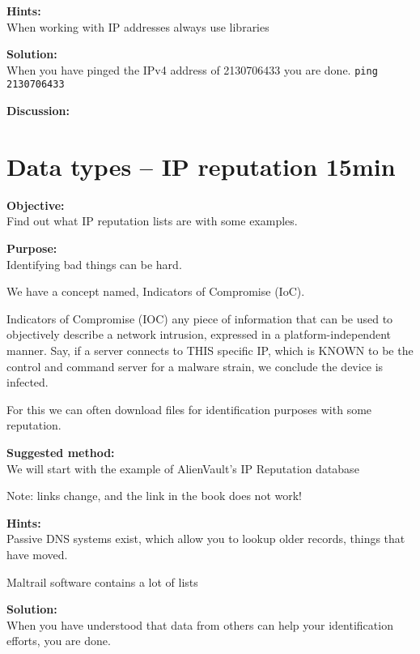 \documentclass[a4paper,11pt,notitlepage]{report}
\begin{document}
{\bf Hints:}\\
When working with IP addresses always use libraries

{\bf Solution:}\\
When you have pinged the IPv4 address of 2130706433 you are done.
\verb+ping 2130706433+


{\bf Discussion:}\\



\chapter{Data types -- IP reputation 15min}
\label{siem:ip-reputation}

{\bf Objective:}\\
Find out what IP reputation lists are with some examples.


{\bf Purpose:}\\
Identifying bad things can be hard.

We have a concept named, Indicators of Compromise (IoC).

Indicators of Compromise (IOC) any piece of information that can be used to objectively describe a network intrusion, expressed in a platform-independent manner. Say, if a server connects to THIS specific IP, which is KNOWN to be the control and command server for a malware strain, we conclude the device is infected.

For this we can often download files for identification purposes with some reputation.

{\bf Suggested method:}\\
We will start with the example of
AlienVault’s IP Reputation database

Note: links change, and the link in the book does not work!




{\bf Hints:}\\
Passive DNS systems exist, which allow you to lookup older records, things that have moved.

Maltrail software contains a lot of lists\\

{\bf Solution:}\\
When you have understood that data from others can help your identification efforts, you are done.
\end{document}
